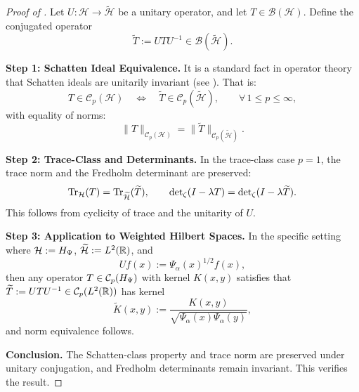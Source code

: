 \begin{proof}[Proof of ]
Let \( U \colon \mathcal{H} \to \widetilde{\mathcal{H}} \) be a unitary operator, and let \( T \in \mathcal{B}(\mathcal{H}) \). Define the conjugated operator
\[
\widetilde{T} := U T U^{-1} \in \mathcal{B}(\widetilde{\mathcal{H}}).
\]

\medskip
\noindent\textbf{Step 1: Schatten Ideal Equivalence.}
It is a standard fact in operator theory that Schatten ideals are unitarily invariant (see \cite[Ch.~1]{Simon2005TraceIdeals}). That is:
\[
T \in \mathcal{C}_p(\mathcal{H}) \quad \iff \quad \widetilde{T} \in \mathcal{C}_p(\widetilde{\mathcal{H}}), \qquad \forall\, 1 \le p \le \infty,
\]
with equality of norms:
\[
\| T \|_{\mathcal{C}_p(\mathcal{H})} = \| \widetilde{T} \|_{\mathcal{C}_p(\widetilde{\mathcal{H}})}.
\]

\medskip
\noindent\textbf{Step 2: Trace-Class and Determinants.}
In the trace-class case \( p = 1 \), the trace norm and the Fredholm determinant are preserved:
\[
\operatorname{Tr}_{\mathcal{H}}(T) = \operatorname{Tr}_{\widetilde{\mathcal{H}}}(\widetilde{T}), \qquad \det\nolimits_\zeta(I - \lambda T) = \det\nolimits_\zeta(I - \lambda \widetilde{T}).
\]
This follows from cyclicity of trace and the unitarity of \( U \).

\medskip
\noindent\textbf{Step 3: Application to Weighted Hilbert Spaces.}
In the specific setting where \( \mathcal{H} := H_{\Psi} \), \( \widetilde{\mathcal{H}} := L^2(\mathbb{R}) \), and
\[
U f(x) := \Psi_\alpha(x)^{1/2} f(x),
\]
then any operator \( T \in \mathcal{C}_p(H_{\Psi}) \) with kernel \( K(x,y) \) satisfies that \( \widetilde{T} := U T U^{-1} \in \mathcal{C}_p(L^2(\mathbb{R})) \) has kernel
\[
\widetilde{K}(x,y) := \frac{K(x,y)}{\sqrt{\Psi_\alpha(x)\Psi_\alpha(y)}},
\]
and norm equivalence follows.

\medskip
\noindent\textbf{Conclusion.}
The Schatten-class property and trace norm are preserved under unitary conjugation, and Fredholm determinants remain invariant. This verifies the result.
\end{proof}
